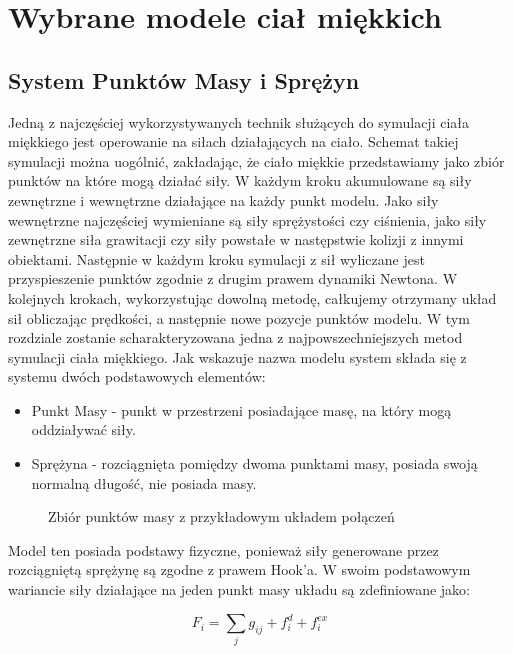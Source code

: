 \section{Wybrane modele ciał miękkich}


\subsection{System Punktów Masy i Sprężyn}

Jedną z najczęściej wykorzystywanych technik służących do symulacji ciała miękkiego jest operowanie na siłach działających na ciało. Schemat takiej symulacji można uogólnić, zakładając, że ciało miękkie przedstawiamy jako zbiór punktów na które mogą działać siły. W każdym kroku akumulowane są siły zewnętrzne i wewnętrzne działające na każdy punkt modelu. Jako siły wewnętrzne najczęściej wymieniane są siły sprężystości czy ciśnienia, jako siły zewnętrzne siła grawitacji czy siły powstałe w następstwie kolizji z innymi obiektami. Następnie w każdym kroku symulacji z sił wyliczane jest przyspieszenie punktów zgodnie z drugim prawem dynamiki Newtona. W kolejnych krokach, wykorzystując dowolną metodę, całkujemy otrzymany układ sił obliczając prędkości, a następnie nowe pozycje punktów modelu.\cite{pbdyn}
W tym rozdziale zostanie scharakteryzowana jedna z najpowszechniejszych metod symulacji ciała miękkiego. Jak wskazuje nazwa modelu system składa się z systemu  dwóch podstawowych elementów:
\begin{itemize}
\item  Punkt Masy - punkt w przestrzeni posiadające masę, na który mogą oddziaływać siły.
\item Sprężyna - rozciągnięta pomiędzy dwoma punktami masy, posiada swoją normalną długość, nie posiada masy.

\end{itemize} 

\begin{figure}[ht]
\centering

\caption{Zbiór punktów masy z przykładowym układem połączeń}
\end{figure}
Model ten posiada podstawy fizyczne, ponieważ siły generowane przez rozciągniętą sprężynę są zgodne z prawem Hook'a. W swoim podstawowym wariancie siły działające na jeden punkt masy układu są zdefiniowane jako:

%
%
\begin{equation}
F_{i} = \sum_{j} g_{ij} + f^{d}_i + f^{ex}_{i}
\end{equation}

